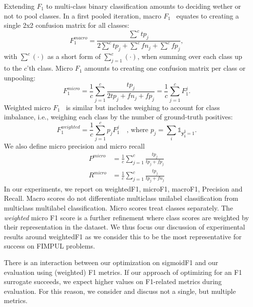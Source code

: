 Extending \(F_1\) to multi-class binary classification amounts to deciding wether or not to pool classes.
In a first pooled iteration, macro \(F_1\)~\cite{multilabelMetrics} equates to creating a single 2x2 confusion matrix for all classes:
%
\begin{equation}
F_1^{macro} = \frac{\sum^c tp_j}{2 \sum^c tp_j + \sum^c fn_j + \sum^c fp_j},
\end{equation}
%
with $\sum^c (\cdot)$ as a short form of $\sum_{j=1}^c(\cdot)$, when summing over each class up to the $c$'th class.
Micro \(F_1\) \cite{threshForF1, multilabelMetrics} amounts to creating one confusion matrix per class or unpooling:
%
\begin{equation}
F_1^{micro} =  \frac{1}{c} \sum_{j=1}^c \frac{tp_j}{2 tp_j + fn_j + fp_j} =  \frac{1}{c} \sum_{j=1}^c F_1^j.
\end{equation}
%
Weighted micro \(F_1\)~\cite{weightedMetrics} is similar but includes weighing to account for class imbalance, i.e., weighing each class by the number of ground-truth positives:
%
\begin{equation}
F_1^{weighted} = \frac{1}{c} \sum_{j=1}^c p_j F_1^j \quad \text{, where } p_j = \sum_i \mathds{1}_{\mathbf{y_i^j} = 1}.
\end{equation}
%
We also define micro precision and micro recall
%
\begin{equation}
\begin{aligned} P^{micro} &=  \frac{1}{c} \sum_{j=1}^c \frac{tp_j}{tp_j+fp_j} \\ R^{micro} &=  \frac{1}{c} \sum_{j=1}^c \frac{tp_j}{tp_j+fn_j} \end{aligned}
\end{equation}
%
In our experiments, we report on weightedF1, microF1, macroF1, Precision and Recall. Macro scores do not differentiate multiclass unilabel classification from multiclass multilabel classification. Micro scores treat classes separately. The \emph{weighted} micro F1 score is a further refinement where class scores are weighted by their representation in the dataset. We thus focus our discussion of experimental results around weightedF1 as we consider this to be the most representative for success on FIMPUL problems. 

There is an interaction between our optimization on sigmoidF1 and our evaluation using (weighted) F1 metrics. If our approach of optimizing for an F1 surrogate succeeds, we expect higher values on F1-related metrics during evaluation. For this reason, we consider and discuss not a single, but multiple metrics.

